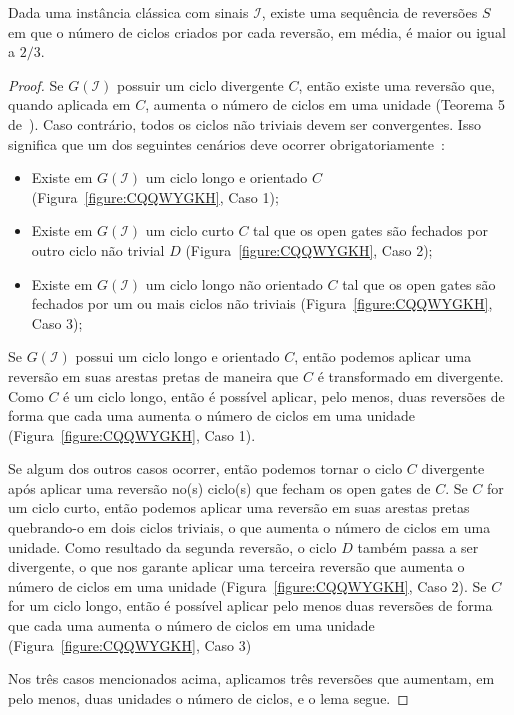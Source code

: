 \begin{lemma}\label{lemma:ZUHMXSRH}
Dada uma instância clássica com sinais $\mathcal{I}$, existe uma sequência de reversões $S$ em que o número de ciclos criados por cada reversão, em média, é maior ou igual a $2/3$.
\end{lemma}
\begin{proof}
Se $G(\mathcal{I})$ possuir um ciclo divergente $C$, então existe uma reversão que, quando aplicada em $C$, aumenta o número de ciclos em uma unidade (Teorema 5 de~\cite{1998-walter-etal}). Caso contrário, todos os ciclos não triviais devem ser convergentes. Isso significa que um dos seguintes cenários deve ocorrer obrigatoriamente~\cite{2019a-oliveira-etal}:
\begin{itemize}
  \item Existe em $G(\mathcal{I})$ um ciclo longo e orientado $C$ (Figura~\ref{figure:CQQWYGKH}, Caso 1);
  \item Existe em $G(\mathcal{I})$ um ciclo curto $C$ tal que os open gates são fechados por outro ciclo não trivial $D$ (Figura~\ref{figure:CQQWYGKH}, Caso 2);
  \item Existe em $G(\mathcal{I})$ um ciclo longo não orientado $C$ tal que os open gates são fechados por um ou mais ciclos não triviais (Figura~\ref{figure:CQQWYGKH}, Caso 3);
\end{itemize}

Se $G(\mathcal{I})$ possui um ciclo longo e orientado $C$, então podemos aplicar uma reversão em suas arestas pretas de maneira que $C$ é transformado em divergente. Como $C$ é um ciclo longo, então é possível aplicar, pelo menos, duas reversões de forma que cada uma aumenta o número de ciclos em uma unidade (Figura~\ref{figure:CQQWYGKH}, Caso 1).

Se algum dos outros casos ocorrer, então podemos tornar o ciclo $C$ divergente após aplicar uma reversão no(s) ciclo(s) que fecham os open gates de $C$. Se $C$ for um ciclo curto, então podemos aplicar uma reversão em suas arestas pretas quebrando-o em dois ciclos triviais, o que aumenta o número de ciclos em uma unidade. Como resultado da segunda reversão, o ciclo $D$ também passa a ser divergente, o que nos garante aplicar uma terceira reversão que aumenta o número de ciclos em uma unidade (Figura~\ref{figure:CQQWYGKH}, Caso 2). Se $C$ for um ciclo longo, então é possível aplicar pelo menos duas reversões de forma que cada uma aumenta o número de ciclos em uma unidade (Figura~\ref{figure:CQQWYGKH}, Caso 3)

Nos três casos mencionados acima, aplicamos três reversões que aumentam, em pelo menos, duas unidades o número de ciclos, e o lema segue.
\end{proof}

